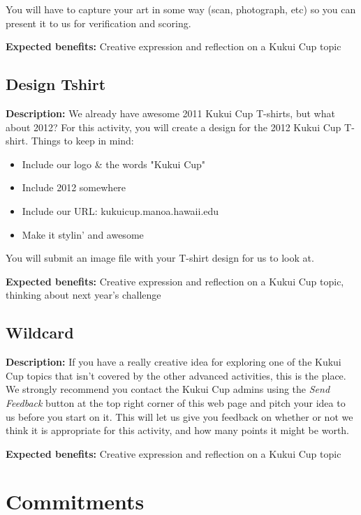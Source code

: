 You will have to capture your art in some way (scan, photograph, etc) so you can present it to us for verification and scoring.

\vspace{2ex}
\textbf{Expected benefits:} Creative expression and reflection on a Kukui Cup topic


\subsection{Design Tshirt}

\textbf{Description:} We already have awesome 2011 Kukui Cup T-shirts, but what about 2012? For this activity, you will create a design for the 2012 Kukui Cup T-shirt. Things to keep in mind:

\begin{itemize}
	\item Include our logo \& the words "Kukui Cup"
	\item Include 2012 somewhere
	\item Include our URL: kukuicup.manoa.hawaii.edu
	\item Make it stylin' and awesome
\end{itemize}

You will submit an image file with your T-shirt design for us to look at.

\vspace{2ex}
\textbf{Expected benefits:} Creative expression and reflection on a Kukui Cup topic, thinking about next year's challenge


\subsection{Wildcard}

\textbf{Description:} If you have a really creative idea for exploring one of the Kukui Cup topics that isn't covered by the other advanced activities, this is the place. We strongly recommend you contact the Kukui Cup admins using the \emph{Send Feedback} button at the top right corner of this web page and pitch your idea to us before you start on it. This will let us give you feedback on whether or not we think it is appropriate for this activity, and how many points it might be worth.

\vspace{2ex}
\textbf{Expected benefits:} Creative expression and reflection on a Kukui Cup topic


\section{Commitments}
\label{sec:commitment-list}


